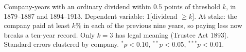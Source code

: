 Company-years with an ordinary dividend within 0.5 points of threshold $k$, in 1879--1887 and 1894--1913. Dependent variable: 1[dividend $\ge k$]. At stake: the company paid at least $k$\% in each of the previous nine years, so paying less now breaks a ten-year record. Only $k = 3$ has legal meaning (Trustee Act 1893). Standard errors clustered by company. $^{*}p<0.10$, $^{**}p<0.05$, $^{***}p<0.01$.
